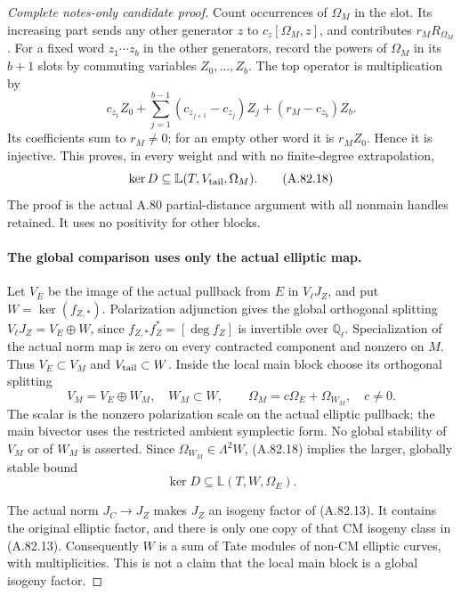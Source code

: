 \begin{proof}[Complete notes-only candidate proof]
Count occurrences of \(\Omega_M\) in the slot. Its increasing
part sends any other generator \(z\) to
\(c_z[\Omega_M,z]\), and contributes \(r_M R_{\Omega_M}\).
For a fixed word \(z_1\cdots z_b\) in the other generators,
record the powers of \(\Omega_M\) in its \(b+1\) slots by
commuting variables \(Z_0,\ldots,Z_b\). The top operator is
multiplication by
\[
 c_{z_1}Z_0+\sum_{j=1}^{b-1}(c_{z_{j+1}}-c_{z_j})Z_j
                              +(r_M-c_{z_b})Z_b.       \tag{A.82.17}
\]
Its coefficients sum to \(r_M\ne0\); for an empty other word
it is \(r_MZ_0\). Hence it is injective. This proves, in every
weight and with no finite-degree extrapolation,
\[
             \ker D\subseteq
                \mathbb L(T,V_{\rm tail},\Omega_M).   \tag{A.82.18}
\]
The proof is the actual A.80 partial-distance argument with all
nonmain handles retained. It uses no positivity for other blocks.

\paragraph{The global comparison uses only the actual elliptic map.}
Let \(V_E\) be the image of the actual pullback from \(E\)
in \(V_\ell J_Z\), and put \(W=\ker(f_{Z,*})\).
Polarization adjunction gives the global orthogonal splitting
\(V_\ell J_Z=V_E\oplus W\), since
\(f_{Z,*}f_Z^*=[\deg f_Z]\) is invertible over \(\mathbb Q_\ell\).
Specialization of the actual norm map is zero on every contracted
component and nonzero on \(M\). Thus \(V_E\subset V_M\) and
\(V_{\rm tail}\subset W\). Inside the local main block choose
its orthogonal splitting
\[
 V_M=V_E\oplus W_M,\quad W_M\subset W,\qquad
                  \Omega_M=c\Omega_E+\Omega_{W_M},
                              \quad c\ne0.            \tag{A.82.19}
\]
The scalar is the nonzero polarization scale on the actual
elliptic pullback; the main bivector uses the restricted ambient
symplectic form. No global stability of \(V_M\) or of \(W_M\)
is asserted. Since \(\Omega_{W_M}\in\Lambda^2W\), (A.82.18)
implies the larger, globally stable bound
\[
                    \ker D\subseteq\mathbb L(T,W,\Omega_E).
                                                               \tag{A.82.20}
\]

The actual norm \(J_C\to J_Z\) makes \(J_Z\) an isogeny
factor of (A.82.13). It contains the original elliptic factor,
and there is only one copy of that CM isogeny class in (A.82.13).
Consequently \(W\) is a sum of Tate modules of non-CM elliptic
curves, with multiplicities. This is not a claim that the local
main block is a global isogeny factor.


\end{proof}
